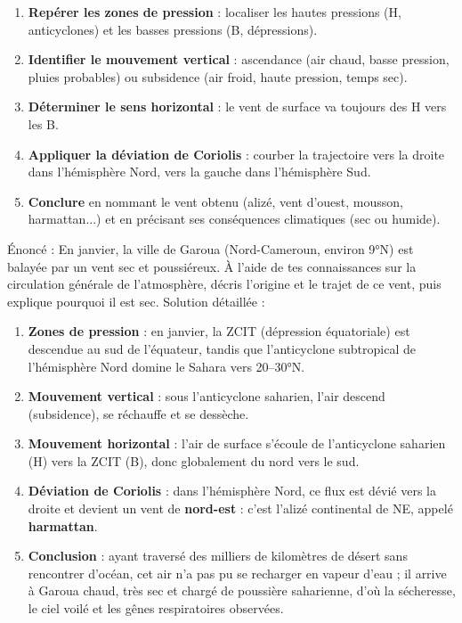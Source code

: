 \documentclass[11pt]{article}
\begin{document}
\begin{methode}
\begin{enumerate}
\item \textbf{Repérer les zones de pression} : localiser les hautes pressions (H, anticyclones) et les basses pressions (B, dépressions).
\item \textbf{Identifier le mouvement vertical} : ascendance (air chaud, basse pression, pluies probables) ou subsidence (air froid, haute pression, temps sec).
\item \textbf{Déterminer le sens horizontal} : le vent de surface va toujours des H vers les B.
\item \textbf{Appliquer la déviation de Coriolis} : courber la trajectoire vers la droite dans l'hémisphère Nord, vers la gauche dans l'hémisphère Sud.
\item \textbf{Conclure} en nommant le vent obtenu (alizé, vent d'ouest, mousson, harmattan...) et en précisant ses conséquences climatiques (sec ou humide).
\end{enumerate}
\end{methode}

\begin{exoresolu}
Énoncé : En janvier, la ville de Garoua (Nord-Cameroun, environ 9°N) est balayée par un vent sec et poussiéreux. À l'aide de tes connaissances sur la circulation générale de l'atmosphère, décris l'origine et le trajet de ce vent, puis explique pourquoi il est sec.
\tcblower
Solution détaillée :
\begin{enumerate}
\item \textbf{Zones de pression} : en janvier, la ZCIT (dépression équatoriale) est descendue au sud de l'équateur, tandis que l'anticyclone subtropical de l'hémisphère Nord domine le Sahara vers 20--30°N.
\item \textbf{Mouvement vertical} : sous l'anticyclone saharien, l'air descend (subsidence), se réchauffe et se dessèche.
\item \textbf{Mouvement horizontal} : l'air de surface s'écoule de l'anticyclone saharien (H) vers la ZCIT (B), donc globalement du nord vers le sud.
\item \textbf{Déviation de Coriolis} : dans l'hémisphère Nord, ce flux est dévié vers la droite et devient un vent de \textbf{nord-est} : c'est l'alizé continental de NE, appelé \textbf{harmattan}.
\item \textbf{Conclusion} : ayant traversé des milliers de kilomètres de désert sans rencontrer d'océan, cet air n'a pas pu se recharger en vapeur d'eau ; il arrive à Garoua chaud, très sec et chargé de poussière saharienne, d'où la sécheresse, le ciel voilé et les gênes respiratoires observées.
\end{enumerate}
\end{exoresolu}
\end{document}
